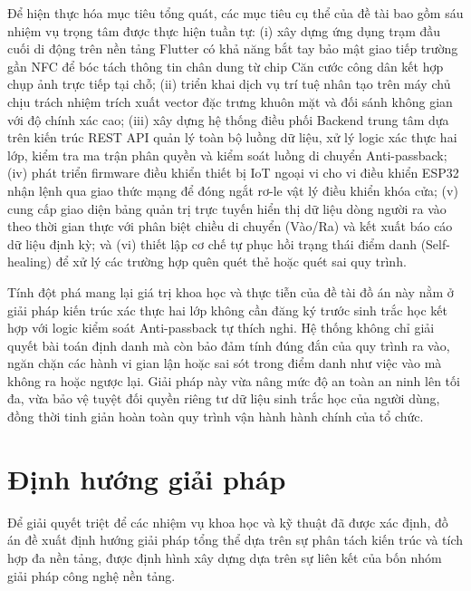 \documentclass[../DoAn.tex]{subfiles}
\begin{document}
Để hiện thực hóa mục tiêu tổng quát, các mục tiêu cụ thể của đề tài bao gồm sáu nhiệm vụ trọng tâm được thực hiện tuần tự: (i) xây dựng ứng dụng trạm đầu cuối di động trên nền tảng Flutter có khả năng bắt tay bảo mật giao tiếp trường gần NFC để bóc tách thông tin chân dung từ chip Căn cước công dân kết hợp chụp ảnh trực tiếp tại chỗ; (ii) triển khai dịch vụ trí tuệ nhân tạo trên máy chủ chịu trách nhiệm trích xuất vector đặc trưng khuôn mặt và đối sánh không gian với độ chính xác cao; (iii) xây dựng hệ thống điều phối Backend trung tâm dựa trên kiến trúc REST API quản lý toàn bộ luồng dữ liệu, xử lý logic xác thực hai lớp, kiểm tra ma trận phân quyền và kiểm soát luồng di chuyển Anti-passback; (iv) phát triển firmware điều khiển thiết bị IoT ngoại vi cho vi điều khiển ESP32 nhận lệnh qua giao thức mạng để đóng ngắt rơ-le vật lý điều khiển khóa cửa; (v) cung cấp giao diện bảng quản trị trực tuyến hiển thị dữ liệu dòng người ra vào theo thời gian thực với phân biệt chiều di chuyển (Vào/Ra) và kết xuất báo cáo dữ liệu định kỳ; và (vi) thiết lập cơ chế tự phục hồi trạng thái điểm danh (Self-healing) để xử lý các trường hợp quên quét thẻ hoặc quét sai quy trình.

Tính đột phá mang lại giá trị khoa học và thực tiễn của đề tài đồ án này nằm ở giải pháp kiến trúc xác thực hai lớp không cần đăng ký trước sinh trắc học kết hợp với logic kiểm soát Anti-passback tự thích nghi. Hệ thống không chỉ giải quyết bài toán định danh mà còn bảo đảm tính đúng đắn của quy trình ra vào, ngăn chặn các hành vi gian lận hoặc sai sót trong điểm danh như việc vào mà không ra hoặc ngược lại. Giải pháp này vừa nâng mức độ an toàn an ninh lên tối đa, vừa bảo vệ tuyệt đối quyền riêng tư dữ liệu sinh trắc học của người dùng, đồng thời tinh giản hoàn toàn quy trình vận hành hành chính của tổ chức.

\section{Định hướng giải pháp}
\label{section:1.3}

Để giải quyết triệt để các nhiệm vụ khoa học và kỹ thuật đã được xác định, đồ án đề xuất định hướng giải pháp tổng thể dựa trên sự phân tách kiến trúc và tích hợp đa nền tảng, được định hình xây dựng dựa trên sự liên kết của bốn nhóm giải pháp công nghệ nền tảng. 
\end{document}
